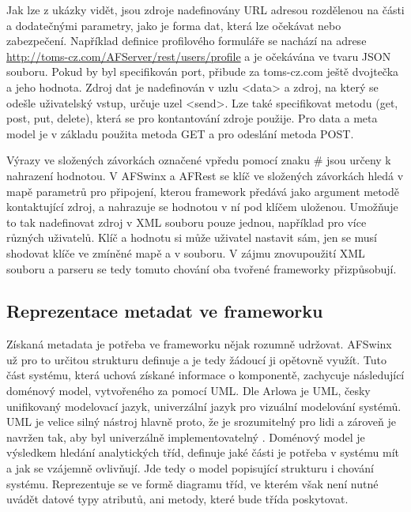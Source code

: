 Jak lze z ukázky vidět, jsou zdroje nadefinovány URL adresou rozdělenou na části a dodatečnými parametry, jako je forma dat, která lze očekávat nebo zabezpečení. Například definice profilového formuláře se nachází na adrese \url{http://toms-cz.com/AFServer/rest/users/profile} a je očekávána ve tvaru JSON souboru. Pokud by byl specifikován port, přibude za toms-cz.com ještě dvojtečka a jeho hodnota. Zdroj dat je nadefinován v uzlu <data> a zdroj, na který se odešle uživatelský vstup, určuje uzel <send>. Lze také specifikovat metodu (get, post, put, delete), která se pro kontantování zdroje použije. Pro data a meta model je v základu použita metoda GET a pro odeslání metoda POST.

Výrazy ve složených závorkách označené vpředu pomocí znaku \# jsou určeny k nahrazení hodnotou. V AFSwinx a AFRest \cite{tomasek-thesis} se klíč ve složených závorkách hledá v mapě parametrů pro připojení, kterou framework předává jako argument metodě kontaktující zdroj, a nahrazuje se hodnotou v ní pod klíčem uloženou. Umožňuje to tak nadefinovat zdroj v XML souboru pouze jednou, například pro více různých uživatelů. Klíč a hodnotu si může uživatel nastavit sám, jen se musí shodovat klíče ve zmíněné mapě a v souboru. V zájmu znovupoužití XML souboru a parseru se tedy tomuto chování oba tvořené frameworky přizpůsobují.

\subsection{Reprezentace metadat ve frameworku}
Získaná metadata je potřeba ve frameworku nějak rozumně udržovat. AFSwinx už pro to určitou strukturu definuje \cite{tomasek-thesis} a je tedy žádoucí ji opětovně využít. Tuto část systému, která uchová získané informace o komponentě, zachycuje následující doménový model, vytvořeného za pomocí UML. Dle Arlowa je UML, česky unifikovaný modelovací jazyk, univerzální jazyk pro vizuální modelování systémů. UML je velice silný nástroj hlavně proto, že je srozumitelný pro lidi a zároveň je navržen tak, aby byl univerzálně implementovatelný \cite{UmlArlow}. Doménový model je výsledkem hledání analytických tříd, definuje jaké části je potřeba v systému mít a jak se vzájemně ovlivňují. Jde tedy o model popisující strukturu i chování systému. Reprezentuje se ve formě diagramu tříd, ve kterém však není nutné uvádět datové typy atributů, ani metody, které bude třída poskytovat.


